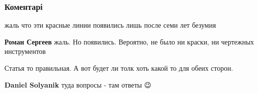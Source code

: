  
 
 
 
 
\subsubsection{Коментарі}

\begin{itemize}
 
жаль что эти красные линии появились лишь после семи лет безумия

\begin{itemize}
 
\textbf{Роман Сергеев} жаль. Но появились. Вероятно, не было ни краски, ни чертежных инструментов
\end{itemize}

 
Статья то правильная. А вот будет ли толк хоть какой то для обеих сторон.

\begin{itemize}
 
\textbf{Daniel Solyanik} туда вопросы - там ответы 😉

 

\end{itemize}
\end{itemize}
